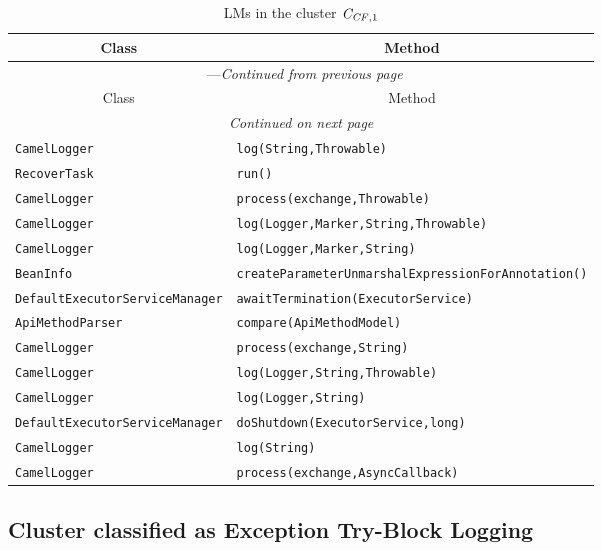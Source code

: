 \begin{center}
\begin{longtable}{ll}
\caption{LMs in the cluster $\mathit{C}_{\mathit{CF},1}$}\\
\toprule\multicolumn{1}{c}{Class}&\multicolumn{1}{c}{Method}\\\midrule
\endfirsthead

\multicolumn{2}{c}{\tablename\ \thetable{}---\textit{Continued from previous page}} \\\midrule
\multicolumn{1}{c}{Class}&\multicolumn{1}{c}{Method}\\\midrule
\endhead
\multicolumn{2}{c}{\textit{Continued on next page}}\\\midrule
\endfoot
\bottomrule
\endlastfoot

\lstinline/CamelLogger/&{\lstinline/log(String,Throwable)/}\\
\lstinline/RecoverTask/&{\lstinline/run()/}\\
\lstinline/CamelLogger/&{\lstinline/process(exchange,Throwable)/}\\
\lstinline/CamelLogger/&{\lstinline/log(Logger,Marker,String,Throwable)/}\\
\lstinline/CamelLogger/&{\lstinline/log(Logger,Marker,String)/}\\
\lstinline/BeanInfo/&{\lstinline/createParameterUnmarshalExpressionForAnnotation()/}\\
\lstinline/DefaultExecutorServiceManager/&{\lstinline/awaitTermination(ExecutorService)/}\\
\lstinline/ApiMethodParser/&{\lstinline/compare(ApiMethodModel)/}\\
\lstinline/CamelLogger/&{\lstinline/process(exchange,String)/}\\
\lstinline/CamelLogger/&{\lstinline/log(Logger,String,Throwable)/}\\
\lstinline/CamelLogger/&{\lstinline/log(Logger,String)/}\\
\lstinline/DefaultExecutorServiceManager/&{\lstinline/doShutdown(ExecutorService,long)/}\\
\lstinline/CamelLogger/&{\lstinline/log(String)/}\\
\lstinline/CamelLogger/&{\lstinline/process(exchange,AsyncCallback)/}\\

\end{longtable}
\end{center}

\subsection{Cluster classified as Exception Try-Block Logging}

